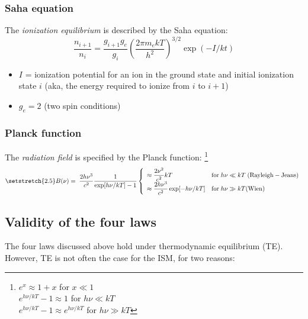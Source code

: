 \documentclass[11pt]{article}
\newcommand{\mar}[1]{\hspace{0pt}\marginpar{-\textcolor{black}{#1}-}}
\begin{document}
\subsubsection{Saha equation}
The \textit{ionization equilibrium} is described by the Saha equation:
\[
    \frac{n_{i+1}}{n_{i}} = \frac{g_{i+1}g_{e}}{g_{i}}
    \left( \frac{2\pi m_{e}kT}{h^{2}} \right) ^{3/2}
    \exp \left( -I/kt \right)
    \]
\begin{itemize}
    \item $I$ = ionization potential for an ion in the ground state
        and initial ionization state $i$ (aka, the energy required to ionize
        from $i$ to $i+1$)
    \item $g_{e} = 2$ (two spin conditions)
\end{itemize}

\subsubsection{Planck function}
The \textit{radiation field} is specified by the Planck function:
\footnote{
    $e^{x} \approx 1 + x$ for $x \ll 1$\\
    $e^{h\nu/kT}-1 \approx 1$ for $h\nu \ll kT$\\
    $e^{h\nu/kT}-1 \approx e^{h\nu/kT}$ for $h\nu \gg kT$}
\begin{equation*}
    \setstretch{2.5}
    B(\nu) = \;\frac{2h\nu^{3}}{c^{2}}\frac{1}{\exp[h\nu/kT]-1}
    \left\{ \begin{array}{l l}
        \approx \dfrac{2\nu^{2}}{c^{2}}kT
        & \mathrm{for}\;h\nu \ll kT\; (\mathrm{Rayleigh-Jeans})\\
        \approx \dfrac{2h\nu^{3}}{c^{2}}\exp[-h\nu/kT]
        & \mathrm{for}\;h\nu \gg kT (\mathrm{Wien})\\
    \end{array}\right.
\end{equation*}

\subsection{Validity of the four laws}
\mar{19}The four laws discussed above hold under thermodynamic equilibrium
(TE). However, TE is not often the case for the ISM, for two reasons:
\end{document}
